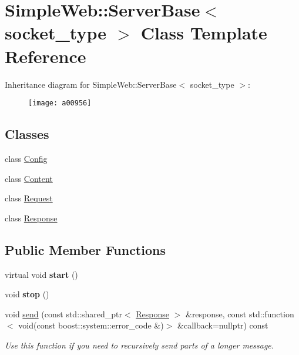 \hypertarget{a00956}{}\section{Simple\+Web\+:\+:Server\+Base$<$ socket\+\_\+type $>$ Class Template Reference}
\label{a00956}
Inheritance diagram for Simple\+Web\+:\+:Server\+Base$<$ socket\+\_\+type $>$\+:\begin{figure}[H]
\begin{center}
\leavevmode
\texttt{[image: a00956]}
\end{center}
\end{figure}
\subsection*{Classes}
\begin{DoxyCompactItemize}
\item 
class \hyperlink{a00972}{Config}
\item 
class \hyperlink{a00964}{Content}
\item 
class \hyperlink{a00968}{Request}
\item 
class \hyperlink{a00960}{Response}
\end{DoxyCompactItemize}
\subsection*{Public Member Functions}
\begin{DoxyCompactItemize}
\item 
\mbox{\label{a00956_a759d6dae5fa77c47a36f7355fd33f8f7}} 
virtual void {\bfseries start} ()
\item 
\mbox{\label{a00956_a0667e44595f6c23016bee67c646ccc85}} 
void {\bfseries stop} ()
\item 
\mbox{\label{a00956_a93fd842b1a02dd63716ff0718f6069ce}} 
void \hyperlink{a00956_a93fd842b1a02dd63716ff0718f6069ce}{send} (const std\+::shared\+\_\+ptr$<$ \hyperlink{a00960}{Response} $>$ \&response, const std\+::function$<$ void(const boost\+::system\+::error\+\_\+code \&)$>$ \&callback=nullptr) const
\begin{DoxyCompactList}\small\item\em Use this function if you need to recursively send parts of a longer message. \end{DoxyCompactList}\end{DoxyCompactItemize}
